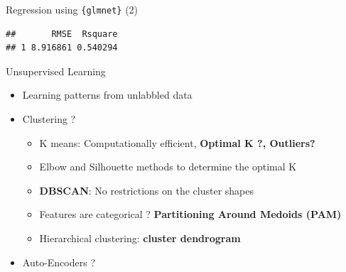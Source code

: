\documentclass[12pt,ignorenonframetext,]{beamer}
\newenvironment{Shaded}{\begin{snugshade}}{\end{snugshade}}
\newcommand{\CommentTok}[1]{\textcolor[rgb]{0.56,0.35,0.01}{\textit{#1}}}
\newcommand{\DataTypeTok}[1]{\textcolor[rgb]{0.13,0.29,0.53}{#1}}
\newcommand{\KeywordTok}[1]{\textcolor[rgb]{0.13,0.29,0.53}{\textbf{#1}}}
\newcommand{\NormalTok}[1]{#1}
\newcommand{\OperatorTok}[1]{\textcolor[rgb]{0.81,0.36,0.00}{\textbf{#1}}}
\newcommand{\StringTok}[1]{\textcolor[rgb]{0.31,0.60,0.02}{#1}}
\providecommand{\tightlist}{%
  \setlength{\itemsep}{0pt}\setlength{\parskip}{0pt}}
\begin{document}
\begin{frame}[fragile]{Regression using \texttt{\{glmnet\}} (2)}
\protect\hypertarget{regression-using-2-1}{}

\tiny

\begin{Shaded}
\end{Shaded}

\begin{verbatim}
##       RMSE  Rsquare
## 1 8.916861 0.540294
\end{verbatim}

\normalsize

\end{frame}

\begin{frame}{Unsupervised Learning}
\protect\hypertarget{unsupervised-learning}{}

\begin{itemize}
\tightlist
\item
  Learning patterns from unlabbled data \vspace{2mm}
\item
  Clustering ? \vspace{2mm}

  \begin{itemize}
      \item K means: Computationally efficient, \textbf{Optimal K ?, Outliers?}
      \item Elbow and Silhouette methods to determine the optimal K
      \item \textbf{DBSCAN}: No restrictions on the cluster shapes
      \item Features are categorical ? \textbf{Partitioning Around Medoids (PAM)}
      \item Hierarchical clustering: \textbf{cluster dendrogram}
    \end{itemize}
  \vspace{2mm}
\item
  Auto-Encoders ?
\end{itemize}

\end{frame}
\end{document}
